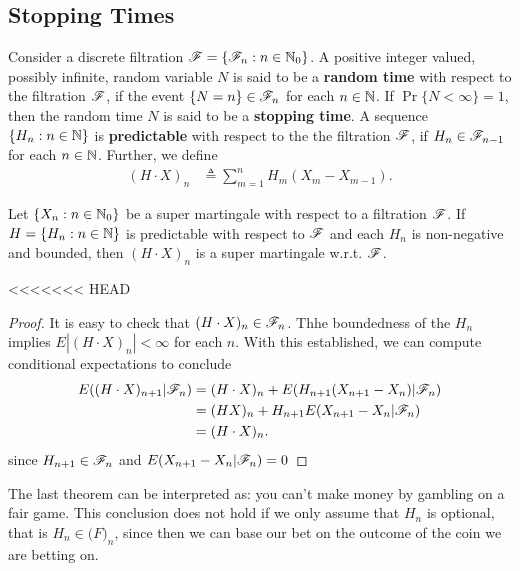\documentclass[a4paper,10pt,english]{article}
\begin{document}
\subsection{Stopping Times}
Consider a discrete filtration $\mathscr{F} = \{\mathscr{F}_n: n \in \mathbb{N}_0\}$.  
A positive integer valued, possibly infinite, random variable $N$ is said to be a \textbf{random time} with respect to the 
filtration $\mathscr{F}$,  if the event $\{N=n\} \in \mathscr{F}_n$ for each $n \in \mathbb{N}$. 
If $\Pr\{N < \infty\}=1$, then the random time $N$ is said to be a \textbf{stopping time}. 
A sequence $\{H_n: n\in \mathbb{N}\}$ is \textbf{predictable} with respect to the the filtration $\mathscr{F}$, if $H_n \in \mathscr{F}_{n-1}$ for each $n \in \mathbb{N}$. 
Further, we define 
\begin{align*}
(H\cdot X)_n &\triangleq \sum_{m=1}^{n}H_m(X_m-X_{m-1}).
\end{align*}
\begin{thm}
Let $\{X_n: n \in \mathbb{N}_0\}$ be a super martingale with respect to a filtration $\mathscr{F}$. 
If $H = \{H_n: n \in \mathbb{N}\}$ is predictable with respect to $\mathscr{F}$ and each $H_n$ is non-negative and bounded, 
then $(H \cdot X)_n$ is a super martingale w.r.t. $\mathscr{F}$. 
\end{thm}
<<<<<<< HEAD
\begin{proof} It is easy to check that $(H\cdot X)_n \in \mathscr{F}_n$. Thhe boundedness of the $H_n$ implies $E|(H\cdot X)_n|<\infty$ for each $n$. With this established, we can compute conditional expectations to conclude
\begin{align*}
E((H\cdot X)_{n+1}| \mathscr{F}_n)&=(H\cdot X)_n+E(H_{n+1}(X_{n+1}-X_n)| \mathscr{F}_n)\\
       &=(HX)_n+H_{n+1}E(X_{n+1}-X_n| \mathscr{F}_n)\\
       &=(H\cdot X)_n.\qedhere
\end{align*}
since $H_{n+1}\in \mathscr{F}_n$ and $E(X_{n+1}-X_n| \mathscr{F}_n)=0$
\end{proof}
The last theorem can be interpreted as: you can't make money by gambling on a fair game. This conclusion does not hold if we only assume that $H_n$ is optional, that is $H_n\in \mathcal(F)_n$, since then we can base our bet on the outcome of the coin we are betting on.
\end{document}
